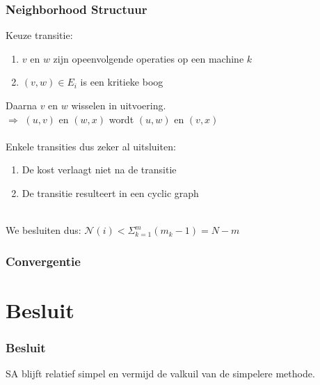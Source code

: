 \documentclass
   [kulak] %
   {kulakbeamer}
\newcommand\tab[1][1cm]{\hspace*{#1}}
\begin{document}
\begin{frame}
\frametitle{Neighborhood Structuur}
	Keuze transitie:\\
	\begin{enumerate}
		\item $v$ en $w$ zijn opeenvolgende operaties op een machine $k$\\
		\item $(v, w)\in E_i$ is een kritieke boog\\ 
	\end{enumerate}
	Daarna $v$ en $w$ wisselen in uitvoering.\\
	\tab $\Rightarrow$ $(u, v)$ en $(w, x)$ wordt $(u, w)$ en $(v, x)$\\~\\
	Enkele transities dus zeker al uitsluiten:\\
	\begin{enumerate}
		\item De kost verlaagt niet na de transitie\\
		\item De transitie resulteert in een cyclic graph\\
	\end{enumerate}
	~\\
	We besluiten dus: $\mathscr{N}(i) < \Sigma_{k=1}^m (m_k - 1) = N - m$
\end{frame}

\begin{frame}
\frametitle{Convergentie}
\end{frame}


\section{Besluit}
\begin{frame}
\frametitle{Besluit}
SA blijft relatief simpel en vermijd de valkuil van de simpelere methode.
\end{frame}
\end{document}
